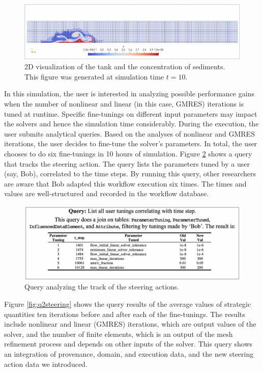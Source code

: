 \begin{figure}[H]
    \centering
    \includegraphics[width=\textwidth,keepaspectratio]{img/tank2d.pdf}
    \caption{2D visualization of the tank and the concentration of sediments. This figure was generated at simulation time $t = 10$.}
    \label{fig:2dtanks}
\end{figure}

In this simulation, the user is interested in analyzing possible performance gains when the number of nonlinear and linear (in this case, GMRES) iterations is tuned at runtime. Specific fine-tunings on different input parameters may impact the solvers and hence the simulation time considerably. During the execution, the user submits analytical queries. Based on the analyses of nonlinear and GMRES iterations, the user decides to fine-tune the solver’s parameters. In total, the user chooses to do six fine-tunings in 10 hours of simulation. Figure \ref{fig:q1steering} shows a query
that tracks the steering action. The query lists the parameters tuned by a user (say, Bob), correlated to the time steps. By running this query, other researchers are aware that Bob adapted this workflow execution six times. The times and values are well-structured and recorded in the workflow database.

\begin{figure}[H]
    \centering
    \includegraphics[width=\textwidth,keepaspectratio]{img/param_tun_q1.pdf}
    \caption{Query analyzing the track of the steering actions.}
    \label{fig:q1steering}
\end{figure}


Figure \ref{fig:q2steering} shows the query results
of the average values of strategic quantities ten iterations before and after each of the  fine-tunings. The results include nonlinear and linear (GMRES)
iterations, which are output values of the solver, and the number of
finite elements, which is an output of the mesh refinement process and
depends on other inputs of the solver. This query shows an integration
of provenance, domain, and execution data, and the new steering action data we introduced.

